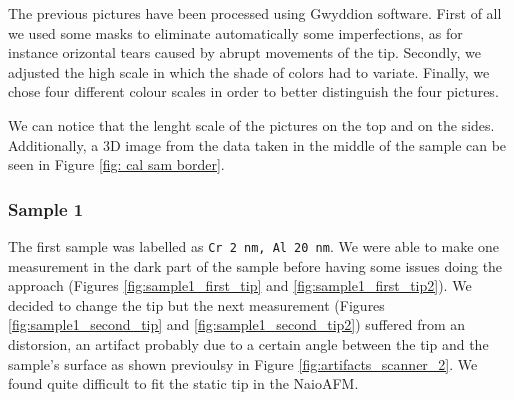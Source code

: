 \documentclass[11pt,a4paper]{article}
\begin{document}
The previous pictures have been processed using Gwyddion software. First of all we used some masks to eliminate automatically some imperfections, as for instance orizontal tears caused by abrupt movements of the tip. Secondly, we adjusted the high scale in which the shade of colors had to variate. Finally, we chose four different colour scales in order to better distinguish the four pictures.

We can notice that the lenght scale of the pictures on the top and on the sides. Additionally, a 3D image from the data taken in the middle of the sample can be seen in Figure \ref{fig: cal sam border}.

\subsubsection{Sample 1}
The first sample was labelled as \texttt{Cr \SI{2}{\nano m}, Al \SI{20}{\nano m}}. We were able to make one measurement in the dark part of the sample before having some issues doing the approach (Figures \ref{fig:sample1_first_tip} and \ref{fig:sample1_first_tip2}). We decided to change the tip but the next measurement (Figures \ref{fig:sample1_second_tip} and \ref{fig:sample1_second_tip2}) suffered from an distorsion, an artifact probably due to a certain angle between the tip and the sample's surface as shown previoulsy in Figure \ref{fig:artifacts_scanner_2}. We found quite difficult to fit the static tip in the NaioAFM.
\end{document}
